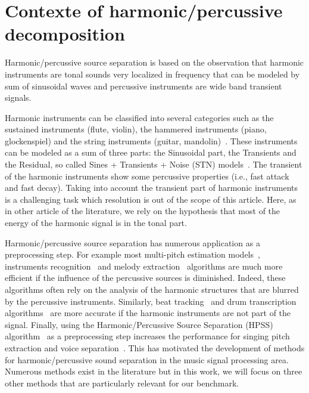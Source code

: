\section{Contexte of harmonic/percussive decomposition}
\label{sec:Background}

Harmonic/percussive source separation is based on the observation that harmonic instruments are tonal sounds very localized in frequency that can be modeled by sum of sinusoidal waves and percussive instruments are wide band transient signals.

Harmonic instruments can be classified into several categories such as the sustained instruments (flute, violin), the hammered instruments (piano, glockenspiel) and the string instruments (guitar, mandolin)~\cite{peeters2003automatic,peeters2003hierarchical}. These instruments can be modeled as a sum of three parts: the Sinusoidal part, the Transients and the Residual, so called  Sines + Transients + Noise (STN) models~\cite{daudet2006review}. The transient of the harmonic instruments show some percussive properties (i.e., fast attack and fast decay). Taking into account the transient part of harmonic instruments is a challenging task which resolution is out of the scope of this article. Here, as in other article of the literature, we rely on the hypothesis that most of the energy of the harmonic signal is in the tonal part. 

Harmonic/percussive source separation has numerous application as a preprocessing step. For example most multi-pitch estimation models~\cite{klapuri2008multipitch}, instruments recognition~\cite{eronen2000musical} and melody extraction~\cite{salamon2012melody} algorithms are much more efficient if the influence of the percussive sources is diminished. Indeed, these algorithms often rely on the analysis of the harmonic structures that are blurred by the percussive instruments. Similarly, beat tracking~\cite{ellis2007beat} and drum transcription algorithms~\cite{paulus2005drum} are more accurate if the harmonic instruments are not part of the signal. Finally, using the Harmonic/Percussive Source Separation (HPSS) algorithm~\cite{fitzgerald2010harmonic} as a preprocessing step increases the performance for singing pitch extraction and voice separation~\cite{hsu2012tandem}. This has motivated the development of methods for harmonic/percussive sound separation in the music signal processing area. Numerous methods exist in the literature but in this work, we will focus on three other methods that are particularly relevant for our benchmark. 

